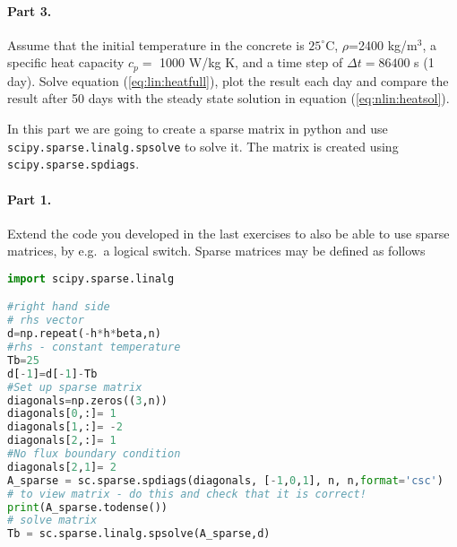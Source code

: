 \documentclass[graybox,sectrefs,envcountresetchap,open=right,final]{svmonodo}
\makeatletter
\newenvironment{doconceexercise}{}{}
\newcounter{doconceexercisecounter}%
\newcommand\listofexercises{
\chapter*{List of Exercises
          \@mkboth{List of Exercises}{List of Exercises}}
\markboth{List of Exercises}{List of Exercises}
\@starttoc{loe}
}
\makeatother
\begin{document}
\begin{doconceexercise}
\paragraph{Part 3.}
Assume that the initial temperature in the concrete is $25^\circ$C, $\rho$=2400 kg/m$^3$, a specific heat capacity $c_p=$ 1000 W/kg K, and a time step of $\Delta t=86400$ s (1 day). Solve equation (\ref{eq:lin:heatfull}), plot the result each day and compare the result after 50 days with the steady state solution in equation (\ref{eq:nlin:heatsol}).

\end{doconceexercise}

\begin{doconceexercise}

                             

In this part we are going to create a sparse matrix in python and use \texttt{scipy.sparse.linalg.spsolve} to solve it. The matrix is created using \texttt{scipy.sparse.spdiags}.

\paragraph{Part 1.}
Extend the code you developed in the last exercises to also be able to use sparse matrices, by e.g.~a logical switch. Sparse matrices may be defined as follows
























\begin{lstlisting}[language=python,style=blue1bar]
import scipy.sparse.linalg

#right hand side
# rhs vector
d=np.repeat(-h*h*beta,n)
#rhs - constant temperature
Tb=25
d[-1]=d[-1]-Tb
#Set up sparse matrix
diagonals=np.zeros((3,n))
diagonals[0,:]= 1
diagonals[1,:]= -2  
diagonals[2,:]= 1
#No flux boundary condition
diagonals[2,1]= 2
A_sparse = sc.sparse.spdiags(diagonals, [-1,0,1], n, n,format='csc')
# to view matrix - do this and check that it is correct!
print(A_sparse.todense())
# solve matrix
Tb = sc.sparse.linalg.spsolve(A_sparse,d)


\end{lstlisting}
\end{doconceexercise}
\end{document}
